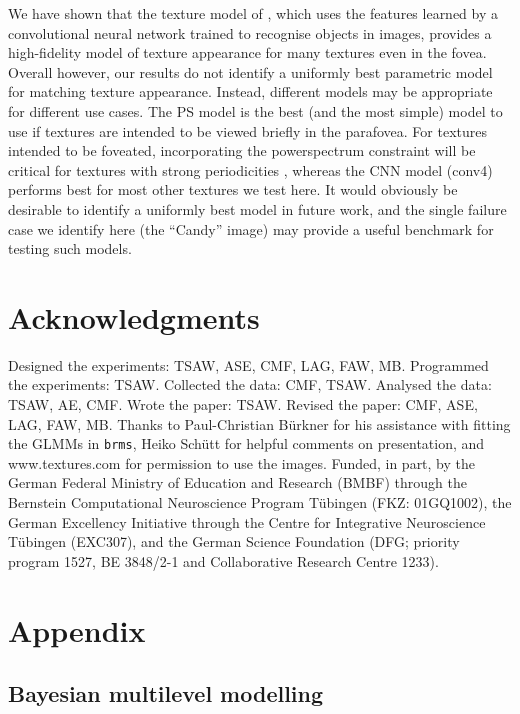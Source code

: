 \documentclass[doc, 11pt,a4paper,natbib]{apa6}\usepackage[]{graphicx}\usepackage[]{color}
\begin{document}
We have shown that the texture model of \citet{gatys_texture_2015-1}, which uses the features learned by a convolutional neural network trained to recognise objects in images, provides a high-fidelity model of texture appearance for many textures even in the fovea.
Overall however, our results do not identify a uniformly best parametric model for matching texture appearance.
Instead, different models may be appropriate for different use cases.
The PS model is the best (and the most simple) model to use if textures are intended to be viewed briefly in the parafovea.
For textures intended to be foveated, incorporating the powerspectrum constraint will be critical for textures with strong periodicities \citep{liu_texture_2016}, whereas the CNN model (conv4) performs best for most other textures we test here.
It would obviously be desirable to identify a uniformly best model in future work, and the single failure case we identify here (the ``Candy'' image) may provide a useful benchmark for testing such models.


\section{Acknowledgments}

Designed the experiments: TSAW, ASE, CMF, LAG, FAW, MB.
Programmed the experiments: TSAW.
Collected the data: CMF, TSAW.
Analysed the data: TSAW, AE, CMF.
Wrote the paper: TSAW.
Revised the paper: CMF, ASE, LAG, FAW, MB.
Thanks to Paul-Christian B\"{u}rkner for his assistance with fitting the GLMMs in \texttt{brms}, Heiko Sch\"{u}tt for helpful comments on presentation, and www.textures.com for permission to use the images.
Funded, in part, by the German Federal Ministry of Education and Research (BMBF) through the Bernstein Computational Neuroscience Program T\"{u}bingen (FKZ: 01GQ1002),
the German Excellency Initiative through the Centre for Integrative Neuroscience T\"{u}bingen (EXC307), 
and the German Science Foundation (DFG; priority program 1527, BE 3848/2-1 and Collaborative Research Centre 1233).

\newpage
\section{Appendix}

\subsection{Bayesian multilevel modelling}
\end{document}
